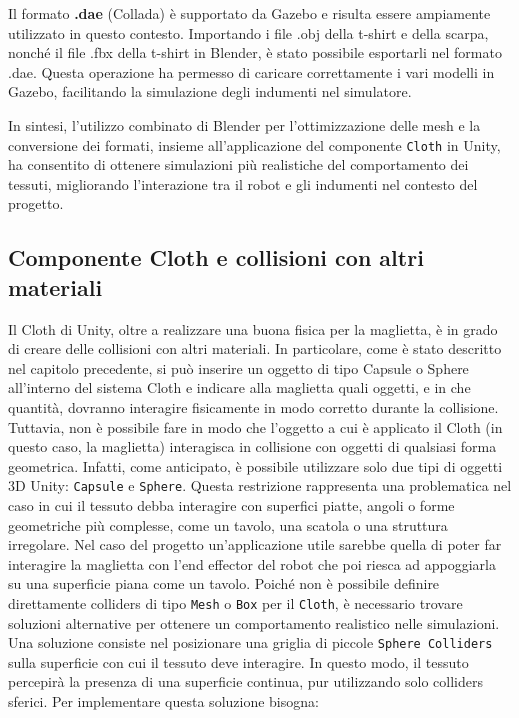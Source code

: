 \documentclass[11pt]{report}
\begin{document}
Il formato  \textbf{.dae} (Collada) è supportato da Gazebo e risulta essere ampiamente utilizzato in questo contesto. Importando i file .obj della t-shirt e della scarpa, nonché il file .fbx della t-shirt in Blender, è stato possibile esportarli nel formato .dae. Questa operazione ha permesso di caricare correttamente i vari modelli in Gazebo, facilitando la simulazione degli indumenti nel simulatore.

In sintesi, l'utilizzo combinato di Blender per l'ottimizzazione delle mesh e la conversione dei formati, insieme all'applicazione del componente \texttt{Cloth} in Unity, ha consentito di ottenere simulazioni più realistiche del comportamento dei tessuti, migliorando l'interazione tra il robot e gli indumenti nel contesto del progetto.

\subsection{Componente Cloth e collisioni con altri materiali}
Il Cloth di Unity, oltre a realizzare una buona fisica per la maglietta, è in grado di creare delle collisioni con altri materiali. In particolare, come è stato descritto nel capitolo precedente, si può inserire un oggetto di tipo Capsule o Sphere all'interno del sistema Cloth e indicare alla maglietta quali oggetti, e in che quantità, dovranno interagire fisicamente in modo corretto durante la collisione. Tuttavia, non è possibile fare in modo che l’oggetto a cui è applicato il Cloth (in questo caso, la maglietta) interagisca in collisione con oggetti di qualsiasi forma geometrica. Infatti, come anticipato, è possibile utilizzare solo due tipi di oggetti 3D Unity: \texttt{Capsule} e \texttt{Sphere}. Questa restrizione rappresenta una problematica nel caso in cui il tessuto debba interagire con superfici piatte, angoli o forme geometriche più complesse, come un tavolo, una scatola o una struttura irregolare. Nel caso del progetto un'applicazione utile sarebbe quella di poter far interagire la maglietta con l'end effector del robot che poi riesca ad appoggiarla su una superficie piana come un tavolo. Poiché non è possibile definire direttamente colliders di tipo \texttt{Mesh} o \texttt{Box} per il \texttt{Cloth}, è necessario trovare soluzioni alternative per ottenere un comportamento realistico nelle simulazioni.
\newline
Una soluzione consiste nel posizionare una griglia di piccole \texttt{Sphere Colliders} sulla superficie con cui il tessuto deve interagire. In questo modo, il tessuto percepirà la presenza di una superficie continua, pur utilizzando solo colliders sferici. Per implementare questa soluzione bisogna:
\end{document}
